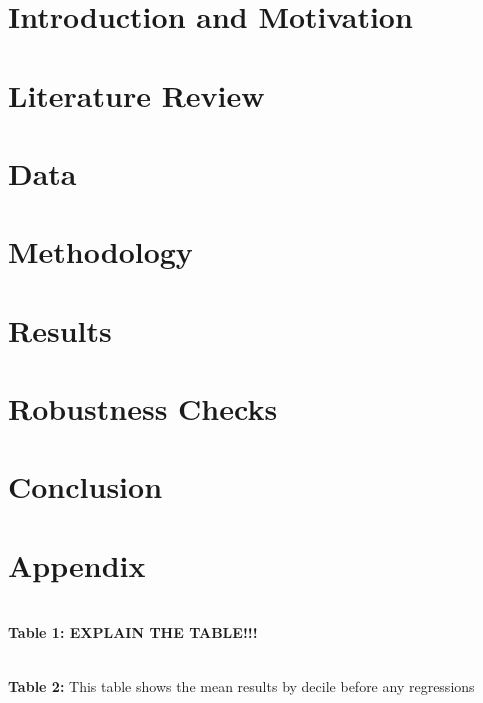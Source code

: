 \documentclass[12pt,oneside,reqno]{amsart}
\begin{document}


\section{Introduction and Motivation}



\section{Literature Review}
\label{Literature}



\section{Data}
\label{Data}


 
\section{Methodology}
\label{Methodology}


\section{Results}
\label{Results}


\section{Robustness Checks}

\label{Robustness}

\section{Conclusion}
\label{Conclusion}

{}

\singlespacing
{}

\section{Appendix}
\begin{center}
    \paperspacingnarrow
    \\
    \textbf{Table 1: EXPLAIN THE TABLE!!!}
    \paperspacingwide
\end{center}

\begin{center}
    \paperspacingnarrow 
    \\
    \textbf{Table 2:} This table shows the mean results by decile before any regressions\\
    \paperspacingwide
 \end{center}
\vspace{1cm}
\end{document}
